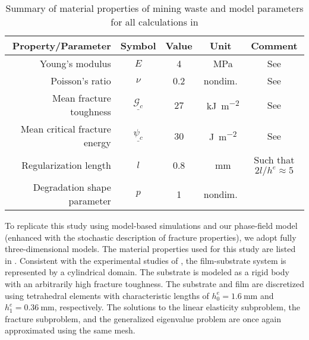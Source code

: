 \begin{table}[htb!]
  \centering
  \caption{Summary of material properties of mining waste and model parameters for all calculations in }
  \begin{tabular}{r c c c c}
    \toprule
    Property/Parameter            & Symbol                      & Value & Unit                                & Comment                                                     \\
    \midrule
    Young's modulus               & $E$                         & 4     & \SI{}{\mega\pascal}                 & See \cite{sanchez2014modeling}                              \\
    Poisson's ratio               & $\nu$                       & 0.2   & nondim.                             & See \cite{sanchez2014modeling}                              \\
    Mean fracture toughness       & $\underline{\mathcal{G}_c}$ & 27    & \SI{}{\kilo\joule\per\square\meter} & See \cite{rodriguez2007experimental,lakshmikantha2009image} \\[5pt]
    Mean critical fracture energy & $\underline{\psi_c}$        & 30    & \SI{}{\joule\per\square\meter}      & See \cite{rodriguez2007experimental,lakshmikantha2009image} \\[5pt]
    Regularization length         & $l$                         & 0.8   & \SI{}{\milli\meter}                 & Such that $2l/h^e \approx 5$                                \\
    Degradation shape parameter   & $p$                         & 1     & nondim.                             &                                                             \\
    \bottomrule
  \end{tabular}
  \label{tab: MW}
\end{table}



To replicate this study using model-based simulations and our phase-field model (enhanced with the stochastic description of fracture properties), we adopt fully three-dimensional models.  The material properties used for this study are  listed in .  Consistent with the experimental studies of \cite{Rodriguez2006}, the film-substrate system is represented by a cylindrical domain. The substrate is modeled as a rigid body with an arbitrarily high fracture toughness. The substrate and film are discretized using tetrahedral elements with characteristic lengths of $h^e_0 = \SI{1.6}{\milli\meter}$ and $h^e_1 = \SI{0.36}{\milli\meter}$, respectively. The solutions to the linear elasticity subproblem, the fracture subproblem, and the generalized eigenvalue problem are once again approximated using the same mesh.


